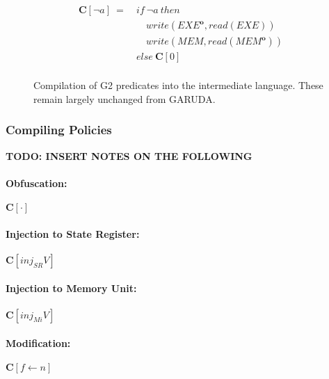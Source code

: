 \documentclass[sigconf,usenames,dvipsnames,svgnames,table]{acmart}
\newcommand{\obf}[1]{#1^\mathbf{o}}
\def \sysname {\textsc{G2}\xspace}
\def \oldname {\textsc{GARUDA}\xspace}
\begin{document}
\begin{figure}
\begin{align*}
            \mathbf{C}[\neg a]\ 
              =\ 
              &if\ \neg a\ then\\
              &\quad write(\obf{EXE}, read(EXE))\\
              &\quad write(MEM, read(\obf{MEM}))\\
              &else\ \mathbf{C}[0]\\
          \end{align*}
          \caption{
            Compilation of \sysname predicates into the intermediate language.
            These remain largely unchanged from \oldname.
          }
          \label{fig:comp:comp:pred}
        \end{figure}

      \subsubsection{Compiling Policies}\label{sec:comp:comp:pol}

        \textbf{TODO: INSERT NOTES ON THE FOLLOWING}

        \paragraph{Obfuscation:}
          $\mathbf{C}[\cdot]$ \par\noindent

        \paragraph{Injection to State Register:}
          $\mathbf{C}[inj_{SR}V]$ \par\noindent

        \paragraph{Injection to Memory Unit:}
          $\mathbf{C}[inj_{Mi}V]$ \par\noindent

        \paragraph{Modification:}
          $\mathbf{C}[f \leftarrow n]$ \par\noindent
\end{document}
